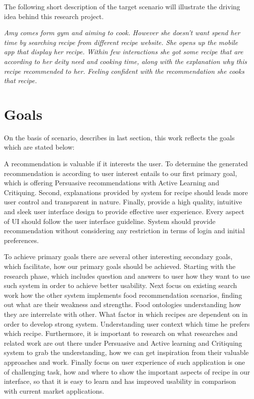 The following short description of the target scenario will illustrate the driving idea behind this research project.\newline

 \textit{Amy comes form gym and aiming to cook. However she doesn’t want spend her time by searching recipe from different recipe website.  She opens up the mobile app that display her recipe. Within few interactions she got some recipe that are according to her deity need and cooking time, along with the explanation why this recipe recommended to her. Feeling confident with the recommendation she cooks that recipe.}\newline

\section{Goals}

On the basis of scenario, describes in last section, this work reflects the goals which are stated below:\newline

A recommendation is valuable if it interests the user. To determine the generated recommendation is according to user interest entails to our first primary goal, which is offering Persuasive recommendations with Active Learning and Critiquing. Second, explanations provided by system for recipe should leads more user control and transparent in nature. Finally, provide a high quality, intuitive and sleek user interface design to provide effective user experience. Every aspect of UI should follow the user interface guideline. System should provide recommendation without considering any restriction in terms of login and initial preferences.\newline

To achieve primary goals there are several other interesting secondary goals, which facilitate, how our primary goals should be achieved. Starting with the research phase, which includes question and answers to user how they want to use such system in order to achieve better usability. Next focus on existing search work how the other system implements food recommendation scenarios, finding out what are their weakness and strengths. Food ontologies understanding how they are interrelate with other. What factor in which recipes are dependent on in order to develop strong system. Understanding user context which time he prefers which recipe. Furthermore, it is important to research on what researches and related work are out there under Persuasive and Active learning and Critiquing system to grab the understanding, how we can get inspiration from their valuable approaches and work. Finally focus on user experience of such application is one of challenging task, how and where to show the important aspects of recipe in our interface, so that it is easy to learn and has improved usability in comparison with current market applications.\newline

